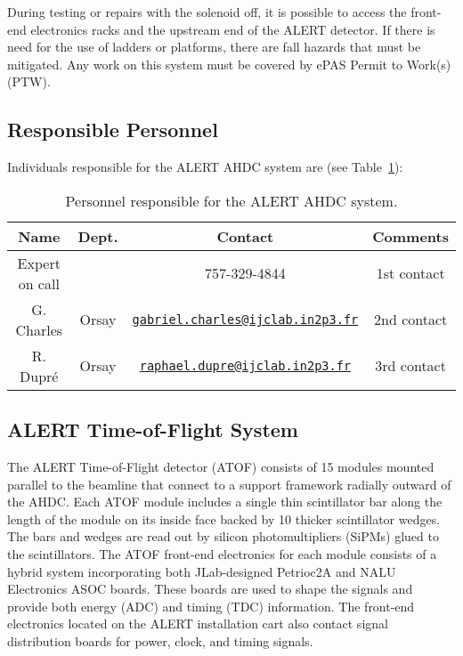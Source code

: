 During testing or repairs with the solenoid off, it is possible to access the front-end electronics
racks and the upstream end of the ALERT detector. If there is need for the use of ladders or platforms,
there are fall hazards that must be mitigated. Any work on this system must be covered by ePAS Permit to
Work(s) (PTW).

\subsection{Responsible Personnel}

Individuals responsible for the ALERT AHDC system are (see Table~\ref{tb:ahdc}):

\begin{table}[!htb]
\centering
\begin{tabular}{|c|c|c|c|} \hline
Name           & Dept.  & Contact &Comments \\ \hline
Expert on call &        & 757-329-4844 & 1st contact \\ \hline
G. Charles     & Orsay & \href{mailto:gabriel.charles@ijclab.in2p3.fr}{\nolinkurl{gabriel.charles@ijclab.in2p3.fr}} &  2nd contact\\ \hline
R. Dupr\'e     & Orsay & \href{mailto:raphael.dupre@ijclab.in2p3.fr}{\nolinkurl{raphael.dupre@ijclab.in2p3.fr}} &  3rd contact\\ \hline
 \end{tabular}
\caption{Personnel responsible for the ALERT AHDC system.} 
\label{tb:ahdc}
\end{table}

\subsection{ALERT Time-of-Flight System}

The ALERT Time-of-Flight detector (ATOF) consists of 15 modules mounted parallel to the beamline
that connect to a support framework radially outward of the AHDC. Each ATOF module includes a single
thin scintillator bar along the length of the module on its inside face backed by 10 thicker scintillator
wedges. The bars and wedges are read out by silicon photomultipliers (SiPMs) glued to the scintillators.
The ATOF front-end electronics for each module consists of a hybrid system incorporating both JLab-designed
Petrioc2A and NALU Electronics ASOC boards. These boards are used to shape the signals and provide both
energy (ADC) and timing (TDC) information. The front-end electronics located on the ALERT installation
cart also contact signal distribution boards for power, clock, and timing signals.


